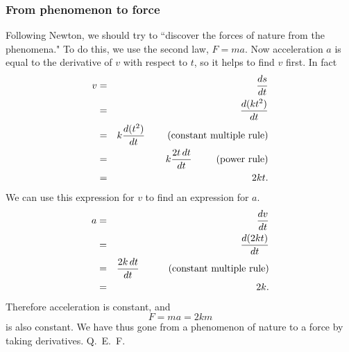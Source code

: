 \documentclass[polutonikogreek,english,twoside,openright]{article}
\begin{document}
\subsubsection*{From phenomenon to force}
Following Newton, we should try to ``discover the forces of nature
from the phenomena."  To do this, we use the second law, $F = ma$.
Now acceleration $a$ is equal to the derivative of $v$ with respect to
$t$, so it helps to find $v$ first.  In fact
\begin{eqnarray*}
  v & = & \frac{ds}{dt}\\
    & = & \frac{d(kt^2)}{dt}\\
    & = & k\frac{d(t^2)}{dt} \mbox{\hspace{2.3em}(constant multiple rule)}\\
    & = & k\frac{2t\,dt}{dt} \mbox{\hspace{2.5em}(power rule)}\\
    & = & 2kt.
\end{eqnarray*}
We can use this expression for $v$ to find an expression for $a$.
\begin{eqnarray*}
  a & = & \frac{dv}{dt}\\
    & = & \frac{d(2kt)}{dt}\\
    & = & \frac{2k\,dt}{dt}\mbox{\hspace{3em}(constant multiple rule)}\\
    & = & 2k.
\end{eqnarray*}
Therefore acceleration is constant, and 
$$F = ma = 2km$$
is also constant.  We have thus gone from a phenomenon of nature to a
force by taking derivatives. Q.~E.~F.\vspace{2ex}
\end{document}
